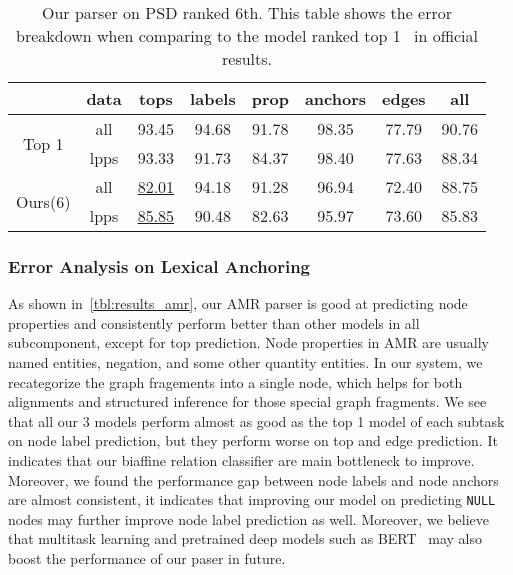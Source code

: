 \begin{table}[!tbp]
\caption{\label{tbl:results_psd} Our parser on PSD ranked 6th. This table shows the error breakdown when comparing to the model ranked top 1~\cite{Don:Fow:Gro:19} in official results.}
\begin{center}
\setlength{\tabcolsep}{3pt}
\begin{tabular}{cccccccc}
\toprule
\hline
                          & data & tops              & labels & prop  & anchors & edges & all   \\ \hline
\multirow{2}{*}{Top 1}   & all  & 93.45             & 94.68  & 91.78 & 98.35   & 77.79 & 90.76 \\
                          & lpps & 93.33             & 91.73  & 84.37 & 98.40   & 77.63 & 88.34 \\
\multirow{2}{*}{ Ours(6)} & all  & \underline{82.01} & 94.18  & 91.28 & 96.94   & 72.40 & 88.75 \\
                          & lpps & \underline{85.85} & 90.48  & 82.63 & 95.97   & 73.60 & 85.83 \\ \hline
\bottomrule
\end{tabular}
\end{center}
\end{table}

\subsubsection{Error Analysis on Lexical Anchoring}
\label{sssec:lex-phr:error-lex}
As shown in~\autoref{tbl:results_amr}, our AMR parser is good at
predicting node properties and consistently perform better than other
models in all subcomponent, except for top prediction. Node properties
in AMR are usually named entities, negation, and some other quantity
entities. In our system, we recategorize the graph fragements into a
single node, which helps for both alignments and structured inference
for those special graph fragments. We see that all our 3 models
perform almost as good as the top 1 model of each subtask on node
label prediction, but they perform worse on top and edge
prediction. It indicates that our biaffine relation classifier are
main bottleneck to improve. Moreover, we found the performance gap
between node labels and node anchors are almost consistent, it
indicates that improving our model on predicting \texttt{NULL} nodes may
further improve node label prediction as well.  Moreover, we believe
that multitask learning and pretrained deep models such as
BERT~\citep{devlin2019bert} may also boost the performance of our paser
in future.

